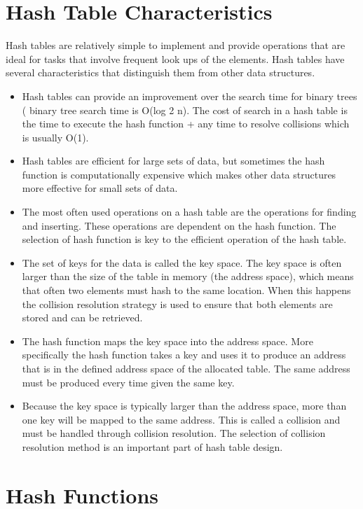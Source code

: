 \section{Hash Table Characteristics}

Hash tables are relatively simple to implement and provide operations that are ideal for tasks that involve frequent look ups of the elements.  Hash tables have several characteristics that  distinguish them from other data structures.


\begin{itemize}
\item Hash tables can provide an improvement over the search time for binary trees ( binary tree search time is O(log 2 n).     The cost of search in a hash table is the time to execute the hash function + any time to resolve collisions which is usually O(1).
\item Hash tables are efficient for large sets of data, but sometimes the hash function is computationally expensive which makes other data structures more effective for small sets of data.
\item The most often used operations on a hash table are the operations for finding and inserting.   These operations are dependent on the hash function.   The selection of hash function is key to the efficient operation of the hash table.
\item The set of keys for the data is called the key space.   The key space is often larger than the size of the table in memory (the address space), which means that often two elements must hash to the same location.  When this happens the collision resolution strategy is used to ensure that both elements are stored and can be retrieved.

\item The hash function maps the key space into the address space.   More specifically the hash function takes a key and uses it to produce an address that is in the defined address space of the allocated table.   The same address must be produced every time given the same key.
\item Because the key space is typically larger than the address space, more than one key will be mapped to the same address.   This is called a collision and must be handled through collision resolution. The selection of collision resolution method is an important part of hash table design.
\end{itemize}


\section{Hash Functions}

